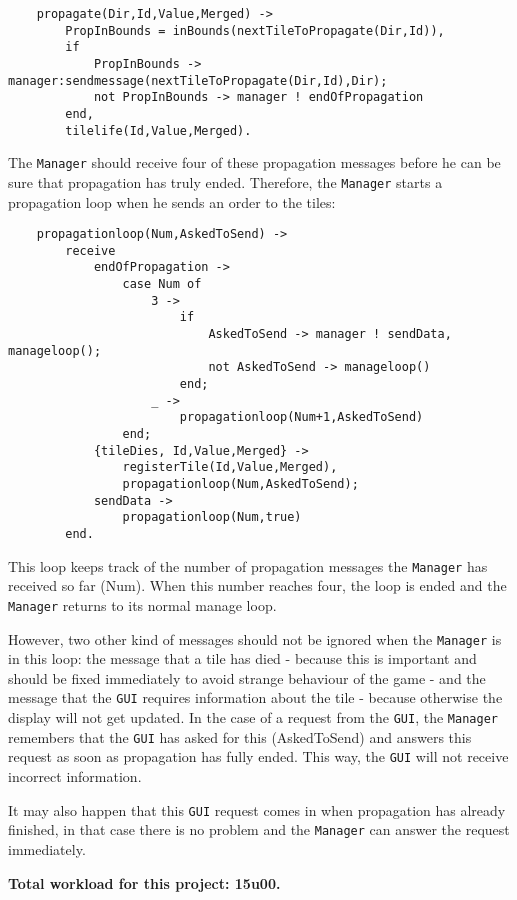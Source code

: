 \documentclass{taak}
\begin{document}
\begin{lstlisting}
	propagate(Dir,Id,Value,Merged) ->
		PropInBounds = inBounds(nextTileToPropagate(Dir,Id)),
		if 
			PropInBounds -> manager:sendmessage(nextTileToPropagate(Dir,Id),Dir);
			not PropInBounds -> manager ! endOfPropagation
		end,
		tilelife(Id,Value,Merged).
\end{lstlisting}

The \texttt{Manager} should receive four of these propagation messages before he can be sure that propagation has truly ended. Therefore, the \texttt{Manager} starts a propagation loop when he sends an order to the tiles:

\begin{lstlisting}
	propagationloop(Num,AskedToSend) ->
		receive
			endOfPropagation ->
				case Num of
					3 -> 
						if
							AskedToSend -> manager ! sendData, manageloop();
							not AskedToSend -> manageloop()
						end;
					_ -> 
						propagationloop(Num+1,AskedToSend)
				end;
			{tileDies, Id,Value,Merged} ->
				registerTile(Id,Value,Merged),
				propagationloop(Num,AskedToSend);
			sendData ->
				propagationloop(Num,true)
		end.
\end{lstlisting}

This loop keeps track of the number of propagation messages the \texttt{Manager} has received so far (Num). When this number reaches four, the loop is ended and the \texttt{Manager} returns to its normal manage loop.

However, two other kind of messages should not be ignored when the \texttt{Manager} is in this loop: the message that a tile has died - because this is important and should be fixed immediately to avoid strange behaviour of the game - and the message that the \texttt{GUI} requires information about the tile - because otherwise the display will not get updated. In the case of a request from the \texttt{GUI}, the \texttt{Manager} remembers that the \texttt{GUI} has asked for this (AskedToSend) and answers this request as soon as propagation has fully ended. This way, the \texttt{GUI} will not receive incorrect information.

It may also happen that this \texttt{GUI} request comes in when propagation has already finished, in that case there is no problem and the \texttt{Manager} can answer the request immediately.


\vspace{1cm}
\flushright
\textbf{Total workload for this project: 15u00.}
\end{document}
